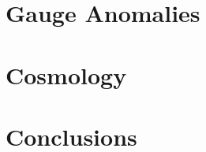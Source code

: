 \documentclass[11pt,a4paper,twoside]{book}
\theoremstyle{definition}
\begin{document}
\part{Gauge Anomalies}




\part{Cosmology}



\part{Conclusions}




\appendix










\end{document}
